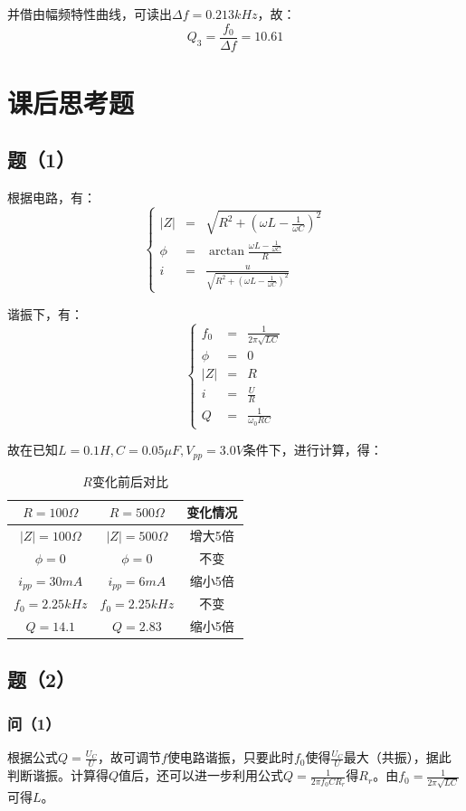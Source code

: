 \documentclass{ctexart}
\begin{document}
并借由幅频特性曲线，可读出$\Delta f=0.213 kHz$，故：$$Q_3=\frac{f_0}{\Delta f}=10.61$$

\section{课后思考题}
\subsection{题（1）}
根据电路，有：$$ \left\{
  \begin{aligned}
  |Z| & = & \sqrt{R^2+(\omega L-\frac{1}{\omega C})^2} \\
  \phi & = & \arctan{\frac{\omega L-\frac{1}{\omega C}}{R}} \\
  i & = & \frac {u}{\sqrt{R^2+(\omega L-\frac{1}{\omega C})^2}}
  \end{aligned}
  \right.
  $$

  谐振下，有：
$$ \left\{
\begin{aligned}
f_0 & = & \frac{1}{2\pi\sqrt{LC}} \\
\phi & = & 0 \\
|Z| & = & R \\
i & = & \frac {U}{R}\\
Q & = & \frac{1}{\omega_0RC}
\end{aligned}
\right.
$$

故在已知$L=0.1H,C=0.05\mu F,V_{pp}=3.0V$条件下，进行计算，得：
\begin{table}[H]
  \centering
  \caption{$R$变化前后对比}
    \begin{tabular}{c|c|c}
    $R=100\Omega$ & $R=500\Omega$ & 变化情况 \\\hline
    $|Z|=100\Omega$ & $|Z|=500\Omega$ & 增大5倍 \\
    $\phi=0$ & $\phi=0$ & 不变 \\
    $i_{pp}=30mA$ & $i_{pp}=6mA$ & 缩小5倍 \\
    $f_0=2.25kHz$ & $f_0=2.25kHz$ & 不变 \\
    $Q=14.1$ & $Q=2.83$ & 缩小5倍 \\
    \end{tabular}%
  \label{tab:addlabel}%
\end{table}%
\subsection{题（2）}
\subsubsection{问（1）}
根据公式$Q=\frac{U_C}{U}$，故可调节$f$使电路谐振，只要此时$f_0$使得$\frac{U_C}{U}$最大（共振），据此判断谐振。计算得$Q$值后，还可以进一步利用公式$Q=\frac{1}{2\pi f_0CR_r}$得$R_r$。由$f_0=\frac{1}{2\pi\sqrt{LC}}$可得$L$。
\end{document}
